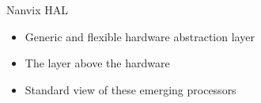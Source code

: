 		\begin{frame}[fragile]{Nanvix HAL}

			\begin{itemize}
				\item Generic and flexible hardware abstraction layer
				\item The layer above the hardware
				\item Standard view of these emerging processors
			\end{itemize}








		\end{frame}

